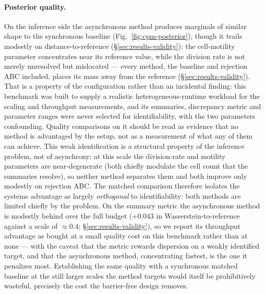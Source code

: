 \paragraph{Posterior quality.} On the inference side the asynchronous method produces marginals of similar shape to the synchronous baseline (Fig.~\ref{fig:cpm-posterior}), though it trails modestly on distance-to-reference (\S\ref{sec:results-validity}): the cell-motility parameter concentrates near its reference value, while the division rate is not merely unresolved but mislocated --- every method, the baseline and rejection ABC included, places its mass away from the reference (\S\ref{sec:results-validity}). That is a property of the configuration rather than an incidental finding: this benchmark was built to supply a realistic heterogeneous-runtime workload for the scaling and throughput measurements, and its summaries, discrepancy metric and parameter ranges were never selected for identifiability, with the two parameters confounding. Quality comparisons on it should be read as evidence that no method is advantaged by the setup, not as a measurement of what any of them can achieve. This weak identification is a structural property of the inference problem, not of asynchrony: at this scale the division-rate and motility parameters are near-degenerate (both chiefly modulate the cell count that the summaries resolve), so neither method separates them and both improve only modestly on rejection ABC. The matched comparison therefore isolates the systems advantage as largely \emph{orthogonal} to identifiability: both methods are limited chiefly by the problem. On the summary metric the asynchronous method is modestly behind over the full budget (${+}0.043$ in Wasserstein-to-reference against a scale of ${\approx}0.4$; \S\ref{sec:results-validity}), so we report its throughput advantage as bought at a small quality cost on this benchmark rather than at none --- with the caveat that the metric rewards dispersion on a weakly identified target, and that the asynchronous method, concentrating fastest, is the one it penalizes most. Establishing the same quality with a synchronous matched baseline at the still larger scales the method targets would itself be prohibitively wasteful, precisely the cost the barrier-free design removes.

